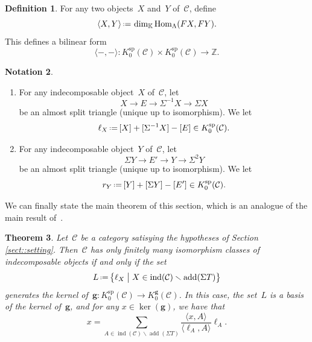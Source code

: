 \documentclass{amsart}
\newtheorem{theorem}{Theorem}[section]
\theoremstyle{definition}
\newtheorem{definition}[theorem]{Definition}
\newtheorem{notation}[theorem]{Notation}
\newcommand{\Z}{\mathbb{Z}} %
\renewcommand{\b}[1]{{\boldsymbol{#1}}} %
\newcommand{\bigset}[2]{\big\{ #1 \;\big|\; #2 \big\}} %
\newcommand{\ssm}{\smallsetminus} %
\newcommand{\eqdef}{\mbox{\,\raisebox{0.2ex}{\scriptsize\ensuremath{\mathrm:}}\ensuremath{=}\,}} %
\newcommand{\field}{\mathbb{K}}
\newcommand{\cat}{\mathcal{C}}
\newcommand{\Hom}[1]{\operatorname{Hom}_{#1}}
\newcommand{\susp}{\Sigma}
\newcommand{\add}{\operatorname{add}}
\newcommand{\spl}{\operatorname{sp}}
\newcommand{\Ksp}{K_0^{\spl}}
\newcommand{\Kg}{K_0^{\b{g}}}
\newcommand{\ind}{\operatorname{ind}}
\begin{document}
\begin{definition}
\label{defi::bilinear form}
 For any two objects~$X$ and~$Y$ of~$\cat$, define
 \[
  \langle X, Y \rangle \eqdef \dim_{\field} \Hom{\Lambda}(FX,FY).
 \]
 This defines a bilinear form
 \[
  \langle -,-\rangle : \Ksp(\cat) \times \Ksp(\cat) \xrightarrow{} \Z.
 \]
\end{definition}

\begin{notation}
\label{notation::ell_X}
\begin{enumerate}
 \item For any indecomposable object~$X$ of~$\cat$, let
 \[
  X \to E \to \susp^{-1} X \to \susp X
 \]
 be an almost split triangle (unique up to isomorphism).  We let
 \[
  \ell_X \eqdef [X] + [\susp^{-1} X]  - [E] \in \Ksp(\cat).
 \]
 
 \item For any indecomposable object~$Y$ of~$\cat$, let
 \[
  \susp Y \to E' \to  Y \to \susp^2 Y
 \]
 be an almost split triangle (unique up to isomorphism).  We let
 \[
  r_Y \eqdef [Y] + [\susp Y]  - [E'] \in \Ksp(\cat).
 \]
\end{enumerate}
\end{notation}


We can finally state the main theorem of this section, which is an analogue of the main result of~\cite{Auslander1984}.

\begin{theorem}
\label{theo::relations-g-vecteurs}
 Let~$\cat$ be a category satisying the hypotheses of Section \ref{sect::setting}.  Then~$\cat$ has only finitely many isomorphism classes of indecomposable objects if and only if the set
 \[
 L \eqdef \bigset{\ell_X}{X\in \ind(\cat) \ssm \add(\susp T)}
 \]
 generates the kernel of~$\b g:\Ksp(\cat) \to \Kg(\cat)$. 
 In this case, the set~$L$ is a basis of the kernel of~$\b g$, and for any $x\in \ker(\b g)$, we have that
 \[
  x= \sum_{A\in \ind(\cat) \ssm \add(\susp T)} \frac{\langle x, A \rangle}{\langle \ell_A, A \rangle} \ell_A.
 \]
\end{theorem}
\end{document}
